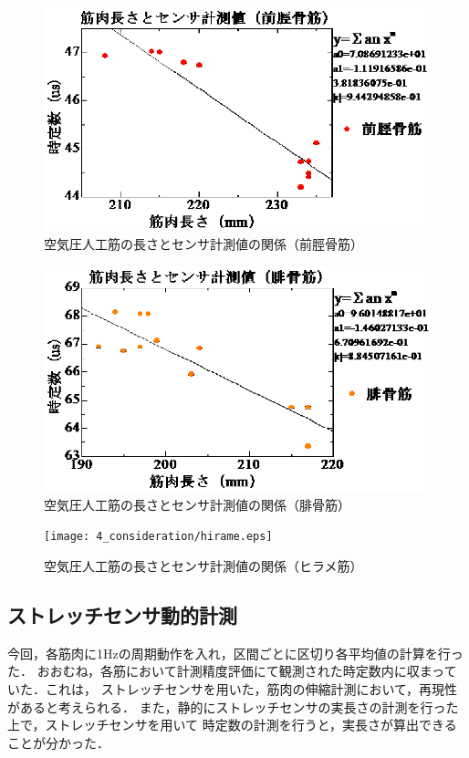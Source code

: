 \begin{figure}[h]
    \begin{center}
        \includegraphics[width=0.7\columnwidth,clip]{4_consideration/zenkei.eps}
    \end{center}
    \caption{空気圧人工筋の長さとセンサ計測値の関係（前脛骨筋）}
    \label{ml-rc1}
\end{figure}
\clearpage
\begin{figure}[h]
    \begin{center}
        \includegraphics[width=0.7\columnwidth,clip]{4_consideration/hikotsu.eps}
    \end{center}
    \caption{空気圧人工筋の長さとセンサ計測値の関係（腓骨筋）}
    \label{ml-rc2}
\end{figure}
\begin{figure}[h]
    \begin{center}
        \texttt{[image: 4\_consideration/hirame.eps]}
    \end{center}
    \caption{空気圧人工筋の長さとセンサ計測値の関係（ヒラメ筋）}
    \label{ml-rc3}
\end{figure}
\clearpage
\subsection{ストレッチセンサ動的計測}
今回，各筋肉に1Hzの周期動作を入れ，区間ごとに区切り各平均値の計算を行った．
おおむね，各筋において計測精度評価にて観測された時定数内に収まっていた．これは，
ストレッチセンサを用いた，筋肉の伸縮計測において，再現性があると考えられる．
また，静的にストレッチセンサの実長さの計測を行った上で，ストレッチセンサを用いて
時定数の計測を行うと，実長さが算出できることが分かった．

